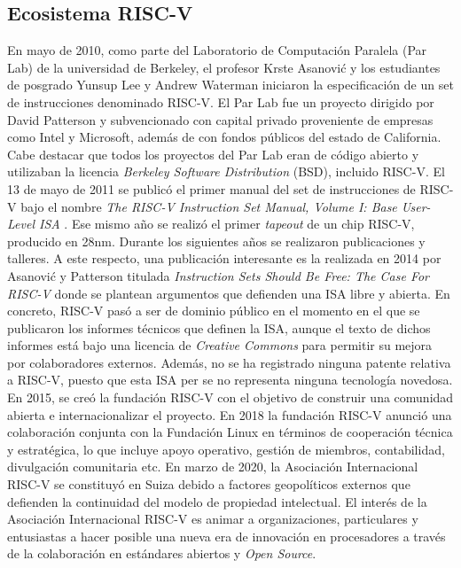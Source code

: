 \subsection{Ecosistema RISC-V}

\label{eco-risc}

En mayo de 2010, como parte del Laboratorio de Computación Paralela (Par Lab) de la universidad de Berkeley, el profesor Krste Asanović y los estudiantes de posgrado Yunsup Lee y Andrew Waterman iniciaron la especificación de un set de instrucciones denominado RISC-V.
El Par Lab fue un proyecto dirigido por David Patterson y subvencionado con capital privado proveniente de empresas como Intel y Microsoft, además de con fondos públicos del estado de California.
Cabe destacar que todos los proyectos del Par Lab eran de código abierto y utilizaban la licencia \textit{Berkeley Software Distribution} (BSD), incluido RISC-V.
El 13 de mayo de 2011 se publicó el primer manual del set de instrucciones de RISC-V bajo el nombre \textit{The RISC-V Instruction Set Manual, Volume I: Base User-Level ISA} \cite{manual-riscv}.
Ese mismo año se realizó el primer \textit{tapeout} de un chip RISC-V, producido en 28nm.
Durante los siguientes años se realizaron publicaciones y talleres.
A este respecto, una publicación interesante es la realizada en 2014 por Asanović y Patterson titulada \textit{Instruction Sets Should Be Free: The Case For RISC-V} \cite{paper-riscv} donde se plantean argumentos que defienden una ISA libre y abierta. 
En concreto, RISC-V pasó a ser de dominio público en el momento en el que se publicaron los informes técnicos que definen la ISA, aunque el texto de dichos informes está bajo una licencia de \textit{Creative Commons} para permitir su mejora por colaboradores externos.
Además, no se ha registrado ninguna patente relativa a RISC-V, puesto que esta ISA per se no representa ninguna tecnología novedosa.
En 2015, se creó la fundación RISC-V con el objetivo de construir una comunidad abierta e internacionalizar el proyecto.
En 2018 la fundación RISC-V anunció una colaboración conjunta con la Fundación Linux en términos de cooperación técnica y estratégica, lo que incluye apoyo operativo, gestión de miembros, contabilidad, divulgación comunitaria etc. 
En marzo de 2020, la Asociación Internacional RISC-V se constituyó en Suiza debido a factores geopolíticos externos que defienden la continuidad del modelo de propiedad intelectual.
El interés de la Asociación Internacional RISC-V es animar a organizaciones, particulares y entusiastas a hacer posible una nueva era de innovación en procesadores a través de la colaboración en estándares abiertos y \textit{Open Source}.

